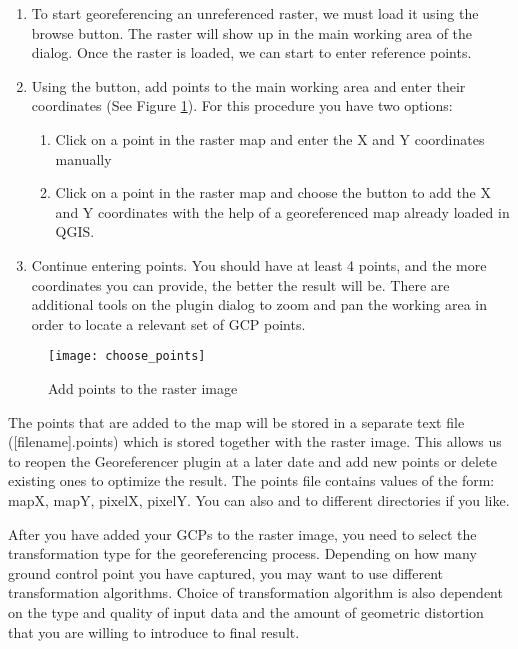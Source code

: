 \label{georeferencer_entering}

\begin{enumerate}
\item To start georeferencing an unreferenced raster, we must load it using the \browsebutton browse button. The raster will show up in the main working area of the dialog. Once the raster is loaded, we can start to enter reference points.

\item Using the  button, add points to the main working area and enter their coordinates (See Figure \ref{fig:choose_points}). For this procedure you have two options:

\begin{enumerate}
\item Click on a point in the raster map and enter the X and Y coordinates manually
\item Click on a point in the raster map and choose the button  to add the X and Y coordinates with the help of a georeferenced map already loaded in QGIS.
\end{enumerate}
\item Continue entering points. You should have at least 4 points, and the more coordinates you can provide, the better the result will be. There are additional tools on the plugin dialog to zoom and pan the working area in order to locate a relevant set of GCP points.
\end{enumerate}

\begin{figure}[ht]
\centering
  \caption{Add points to the raster image \nixcaption}\label{fig:choose_points}\smallskip
  \texttt{[image: choose\_points]}
\end{figure}

The points that are added to the map will be stored in a separate text file ([filename].points) which is stored together with the raster image. This allows us to reopen the Georeferencer plugin at a later date and add new points or delete existing ones to optimize the result. The points file contains values of the form: mapX, mapY, pixelX, pixelY. You can also  and  to different directories if you like.

\label{georeferencer_transformation}

After you have added your GCPs to the raster image, you need to select the transformation type for the georeferencing process. Depending on how many ground control point you have captured, you may want to use different transformation algorithms. Choice of transformation algorithm is also dependent on the type and quality of input data and the amount of geometric distortion that you are willing to introduce to final result.

